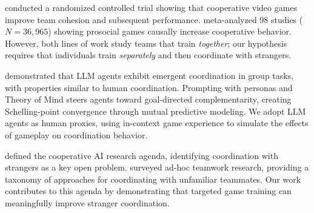 \citet{keith2021team} conducted a randomized controlled trial showing that cooperative video games improve team cohesion and subsequent performance.
\citet{greitemeyer2014prosocial} meta-analyzed 98 studies ($N{=}36{,}965$) showing prosocial games causally increase cooperative behavior.
However, both lines of work study teams that train \emph{together}; our hypothesis requires that individuals train \emph{separately} and then coordinate with strangers.

\citet{riedl2026emergent} demonstrated that LLM agents exhibit emergent coordination in group tasks, with properties similar to human coordination.
Prompting with personas and Theory of Mind steers agents toward goal-directed complementarity, creating Schelling-point convergence through mutual predictive modeling.
We adopt LLM agents as human proxies, using in-context game experience to simulate the effects of gameplay on coordination behavior.

\citet{dafoe2020open} defined the cooperative AI research agenda, identifying coordination with strangers as a key open problem.
\citet{mirsky2022survey} surveyed ad-hoc teamwork research, providing a taxonomy of approaches for coordinating with unfamiliar teammates.
Our work contributes to this agenda by demonstrating that targeted game training can meaningfully improve stranger coordination.
